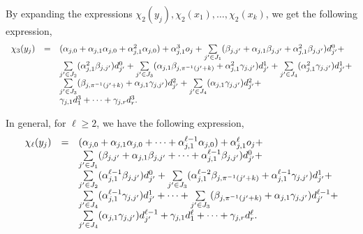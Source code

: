 \documentclass[runningheads,a4paper]{llncs}
\begin{document}
By expanding the expressions $\chi_2(y_j), \chi_2(x_1),\dots,\chi_2(x_k)$, we get the following expression,
\[
\begin{array}{l c l}
\chi_3(y_j)  & = & (\alpha_{j,0} + \alpha_{j,1} \alpha_{j,0}+\alpha^2_{j,1} \alpha_{j,0}) + \alpha^3_{j,1} o_j + \sum \limits_{j' \in J_1} (\beta_{j,j'}+\alpha_{j,1}\beta_{j,j'} + \alpha^2_{j,1}  \beta_{j,j'}) d^0_{j'} + \\
& & \sum \limits_{j' \in J_2} (\alpha^2_{j,1}\beta_{j,j'}) d^0_{j'} +  \sum \limits_{j' \in J_3} (\alpha_{j,1}\beta_{j, \pi^{-1}(j'+k)}+\alpha^2_{j,1}\gamma_{j,j'}) d^1_{j'} + \sum \limits_{j' \in J_4} (\alpha^2_{j,1} \gamma_{j,j'}) d^1_{j'} +\\
& & \sum \limits_{j' \in J_3} (\beta_{j, \pi^{-1}(j'+k)}+\alpha_{j,1}\gamma_{j,j'}) d^2_{j'} + \sum \limits_{j' \in J_4} (\alpha_{j,1} \gamma_{j,j'}) d^2_{j'} +\\
& & \gamma_{j, 1} d^3_{1} + \dots + \gamma_{j,r} d^3_{r}.
\end{array} 
\]

In general, for $\ell \ge 2$, we have the following expression,
\[
\begin{array}{l c l}
\chi_\ell(y_j)  & = & (\alpha_{j,0} + \alpha_{j,1} \alpha_{j,0}+ \dots +\alpha^{\ell-1}_{j,1} \alpha_{j,0}) + \alpha^\ell_{j,1} o_j + \\
& & \sum \limits_{j' \in J_1} (\beta_{j,j'}+\alpha_{j,1}\beta_{j,j'} + \dots +\alpha^{\ell-1}_{j,1}  \beta_{j,j'}) d^0_{j'} + \\
%
& & \sum \limits_{j' \in J_2} (\alpha^{\ell-1}_{j,1}\beta_{j,j'}) d^0_{j'} +  \sum \limits_{j' \in J_3} (\alpha^{\ell-2}_{j,1}\beta_{j, \pi^{-1}(j'+k)}+\alpha^{\ell-1}_{j,1}\gamma_{j,j'}) d^1_{j'} + \\
%
& & \sum \limits_{j' \in J_4} (\alpha^{\ell-1}_{j,1} \gamma_{j,j'}) d^1_{j'} + \dots + \sum \limits_{j' \in J_3} (\beta_{j, \pi^{-1}(j'+k)}+\alpha_{j,1}\gamma_{j,j'}) d^{\ell-1}_{j'} + \\
%
& & \sum \limits_{j' \in J_4} (\alpha_{j,1} \gamma_{j,j'}) d^{\ell-1}_{j'} + \gamma_{j, 1} d^\ell_{1} + \dots + \gamma_{j,r} d^\ell_{r}.
\end{array} 
\]
\end{document}
